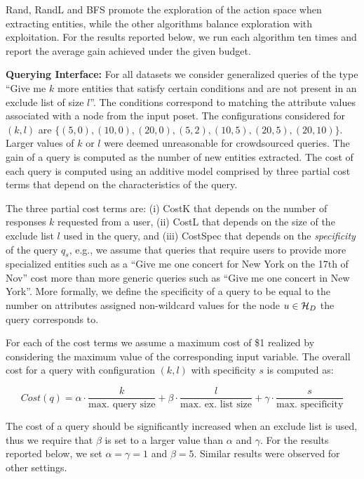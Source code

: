 Rand, RandL and BFS promote the exploration of the action space when extracting entities, while the other algorithms balance exploration with exploitation. For the results reported below, we run each algorithm ten times and report the average gain achieved under the given budget.

\vspace{2pt}\noindent\textbf{Querying Interface:} For all datasets we consider generalized queries of the type ``Give me $k$ more entities that satisfy certain conditions and are not present in an exclude list of size $l$''. The conditions correspond to matching the attribute values associated with a node from the input poset. The  configurations considered for $(k,l)$ are $\{(5,0), (10,0), (20,0), (5,2), (10,5), (20,5), (20,10)\}$. Larger values of $k$ or $l$ were deemed unreasonable for crowdsourced queries. The gain of a query is computed as the number of new entities extracted. The cost of each query is computed using an additive model comprised by three partial cost terms that depend on the characteristics of the query. 

The three partial cost terms are: (i) {\sf CostK} that depends on the number of responses $k$ requested from a user, (ii) {\sf CostL} that depends on the size of the exclude list $l$ used in the query, and (iii) {\sf CostSpec} that depends on the {\em specificity} of the query $q_s$, e.g., we assume that queries that require users to provide more specialized entities such as a ``Give me one concert for New York on the 17th of Nov'' cost more than more generic queries such as ``Give me one concert in New York''. More formally, we define the specificity of a query to be equal to the number on attributes assigned non-wildcard values for the node $u \in \mathcal{H}_D$ the query corresponds to. 

For each of the cost terms we assume a maximum cost of \$1 realized by considering the maximum value of the corresponding input variable. The overall cost for a query with configuration $(k,l)$ with specificity $s$ is computed as:

{\small
\begin{equation}
Cost(q) = \alpha \cdot \frac{k}{\mbox{max. query size}} + \beta \cdot  \frac{l}{\mbox{max. ex. list size}} + \gamma \cdot  \frac{s}{\mbox{max. specificity}} \nonumber
\end{equation}}

The cost of a query should be significantly increased when an exclude list is used, thus we require that $\beta$ is set to a larger value than $\alpha$ and $\gamma$. For the results reported below, we set $\alpha = \gamma = 1$ and $\beta = 5$. Similar results were observed for other settings.

